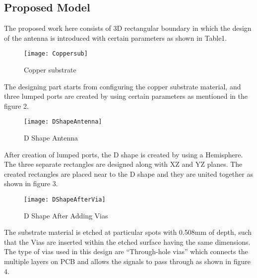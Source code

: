 \documentclass[12pt]{article}
\begin{document}

\newpage
\subsection{Proposed Model}
\par The proposed work here consists of 3D rectangular boundary in which the design of the antenna is introduced with certain parameters as shown in Table1.\\

\begin{center}
\begin{figure}[H]
    \centering
    \texttt{[image: Coppersub]}
    \caption{Copper substrate}
    \label{fig:copper substrate}
\end{figure}
\end{center}

\par The designing part starts from configuring the copper substrate material, and three lumped ports are created by using certain parameters as mentioned in the figure 2.

\begin{center}
\begin{figure}[H]
    \centering
    \texttt{[image: DShapeAntenna]}
    \caption{D Shape Antenna}
    \label{fig:D Shape Antenna}
\end{figure}
\end{center}

\par After creation of lumped ports, the D shape is created by using a Hemisphere. The three separate rectangles are designed along with XZ and YZ planes. The created rectangles are placed near to the D shape and they are united together as shown in figure 3.

\begin{center}
\begin{figure}[H]
    \centering
    \texttt{[image: DShapeAfterVia]}
    \caption{D Shape After Adding Vias}
    \label{fig:D Shape after adding vias}
\end{figure}
\end{center}

\par The substrate material is etched at particular spots with 0.508mm of depth, such that the Vias are inserted within the etched surface having the same dimensions. The type of vias used in this design are “Through-hole vias” which connects the multiple layers on PCB and allows the signals to pass through as shown in figure 4.
\end{document}
